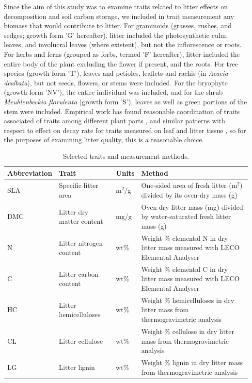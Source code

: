 \documentclass{article}
\begin{document}
Since the aim of this study was to examine traits related to litter effects on decomposition and soil carbon storage, we included in trait measurement any biomass that would contribute to litter. For graminoids (grasses, rushes, and sedges; growth form 'G' hereafter), litter included the photosynthetic culm, leaves, and involucral leaves (where existent), but not the inflorescence or roots. For herbs and ferns (grouped as forbs, termed 'F' hereafter), litter included the entire body of the plant excluding the flower if present, and the roots. For tree species (growth form 'T'), leaves and petioles, leaflets and rachis (in \textit{Acacia dealbata}), but not seeds, flowers, or stems were included. For the bryophyte (growth form 'NV'), the entire individual was included, and for the shrub \textit{Meuhlenbeckia florulenta} (growth form 'S'), leaves as well as green portions of the stem were included. Empirical work has found reasonable coordination of traits associated of traits among different plant parts \citep[for example, leaves and stem,][]{reich2014,jackson2013}, and similar patterns with respect to effect on decay rate for traits measured on leaf and litter tissue \citep{cornwell2008}, so for the purposes of examining litter quality, this is a reasonable choice. 

\begin{table}[ht]
	\caption{Selected traits and measurement methods.}
	\label{Tab:traits}
	\centering
	\small
	\begin{tabularx}{\textwidth}{lllX}
        		\toprule
        		Abbreviation & Trait & Units & Method \\
        		\midrule
		SLA & Specific litter area & m$^2$/g & One-sided area of fresh litter (m$^2$) divided by its oven-dry mass (g) \\
		DMC & Litter dry matter content & mg/g & Oven-dry litter mass (mg) divided by water-saturated fresh litter mass (g) \\
		N & Litter nitrogen content & wt\% & Weight \% elemental N in dry litter mass measured with LECO Elemental Analyser \\
		C & Litter carbon content & wt\% & Weight \% elemental C in dry litter mass measured with LECO Elemental Analyser \\
		HC & Litter hemicelluloses & wt\% & Weight \% hemicelluloses in dry litter mass from thermogravimetric analysis \\
		CL & Litter cellulose & wt\% & Weight \% cellulose in dry litter mass from thermogravimetric analysis \\
		LG & Litter lignin & wt\% & Weight \% lignin in dry litter mass from thermogravimetric analysis \\
        		\bottomrule
	\end{tabularx}
\end{table}
\end{document}
